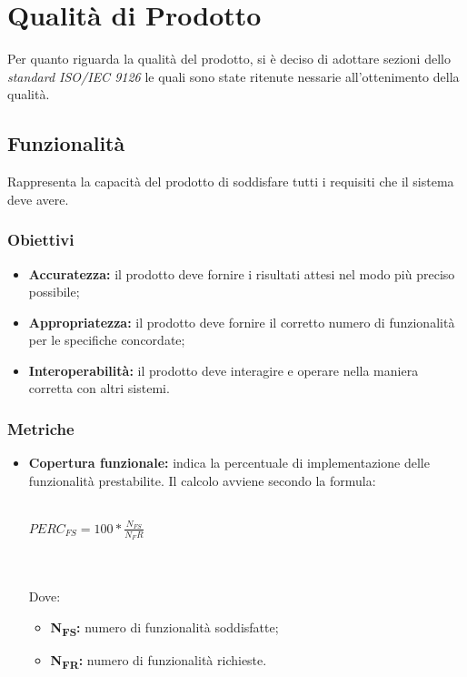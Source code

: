 \section{Qualità di Prodotto}
Per quanto riguarda la qualità del prodotto, si è deciso di adottare sezioni dello 
\textit{standard ISO/IEC 9126\glos} le quali sono state ritenute nessarie
all'ottenimento della qualità.
\subsection{Funzionalità}
Rappresenta la capacità del prodotto di soddisfare tutti i requisiti che il sistema deve avere.
\subsubsection{Obiettivi}
\begin{itemize}
	\item \textbf{Accuratezza:} il prodotto deve fornire i risultati attesi nel modo più preciso possibile;
	\item \textbf{Appropriatezza:} il prodotto deve fornire il corretto numero di funzionalità per le specifiche concordate;
	\item \textbf{Interoperabilità:} il prodotto deve interagire e operare nella maniera corretta con altri sistemi.
\end{itemize}
\subsubsection{Metriche}
\begin{itemize}
	\item \textbf{Copertura funzionale:} indica la percentuale di implementazione delle funzionalità prestabilite. Il calcolo avviene secondo la formula:\\\\
	\centerline{
		\begin{math}
		PERC_{FS}=100*\frac{N_{FS}}{N_FR}
		\end{math}
	}
	\\\\
	Dove:
	\begin{itemize}
		\item \textbf{N\textsubscript{FS}:} numero di funzionalità soddisfatte;
		\item \textbf{N\textsubscript{FR}:} numero di funzionalità richieste.
	\end{itemize}
\end{itemize}

